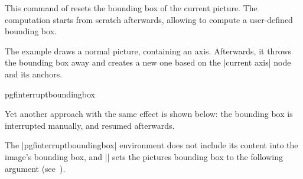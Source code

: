 \begin{command}{\pgfresetboundingbox}
    This command of \pgfname{} resets the bounding box of the current picture.
    The computation starts from scratch afterwards, allowing to compute a
    user-defined bounding box.
\begin{codeexample}[]
\setlength{\fboxsep}{0pt}%
\end{codeexample}
    The example draws a normal picture, containing an axis. Afterwards, it
    throws the bounding box away and creates a new one based on the
    |current axis| node and its anchors.
\end{command}

\begin{environment}{{pgfinterruptboundingbox}}

{
    Yet another approach with the same effect is shown below: the bounding box
    is interrupted manually, and resumed afterwards.
\begin{codeexample}[]
\setlength{\fboxsep}{0pt}%
\end{codeexample}
}
    The |pgfinterruptboundingbox| environment does not include its content into
    the image's bounding box, and |\useasboundingbox| sets the pictures
    bounding box to the following argument (see~\cite{tikz}).
\end{environment}

